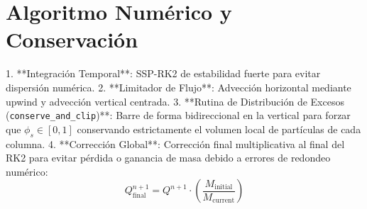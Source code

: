 \documentclass[11pt,a4paper]{article}
\begin{document}
\section{Algoritmo Numérico y Conservación}
1. **Integración Temporal**: SSP-RK2 de estabilidad fuerte para evitar dispersión numérica.
2. **Limitador de Flujo**: Advección horizontal mediante upwind y advección vertical centrada.
3. **Rutina de Distribución de Excesos (\texttt{conserve\_and\_clip})**: Barre de forma bidireccional en la vertical para forzar que $\phi_s \in [0, 1]$ conservando estrictamente el volumen local de partículas de cada columna.
4. **Corrección Global**: Corrección final multiplicativa al final del RK2 para evitar pérdida o ganancia de masa debido a errores de redondeo numérico:
   \begin{equation}
   Q^{n+1}_{\text{final}} = Q^{n+1} \cdot \left( \frac{M_{\text{initial}}}{M_{\text{current}}} \right)
   \end{equation}
\end{document}

